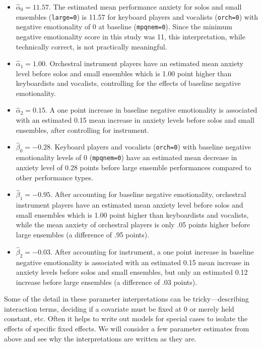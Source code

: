 \documentclass[
]{krantz}
\providecommand{\tightlist}{%
  \setlength{\itemsep}{0pt}\setlength{\parskip}{0pt}}
\begin{document}
\begin{itemize}
\tightlist
\item
  \(\hat{\alpha}_{0} = 11.57\). The estimated mean performance anxiety for solos and small ensembles (\texttt{large=0}) is 11.57 for keyboard players and vocalists (\texttt{orch=0}) with negative emotionality of 0 at baseline (\texttt{mpqnem=0}). Since the minimum negative emotionality score in this study was 11, this interpretation, while technically correct, is not practically meaningful.
\item
  \(\hat{\alpha}_{1} = 1.00\). Orchestral instrument players have an estimated mean anxiety level before solos and small ensembles which is 1.00 point higher than keyboardists and vocalists, controlling for the effects of baseline negative emotionality.
\item
  \(\hat{\alpha}_{2} = 0.15\). A one point increase in baseline negative emotionality is associated with an estimated 0.15 mean increase in anxiety levels before solos and small ensembles, after controlling for instrument.
\item
  \(\hat{\beta}_{0} = -0.28\). Keyboard players and vocalists (\texttt{orch=0}) with baseline negative emotionality levels of 0 (\texttt{mpqnem=0}) have an estimated mean decrease in anxiety level of 0.28 points before large ensemble performances compared to other performance types.
\item
  \(\hat{\beta}_{1} = -0.95\). After accounting for baseline negative emotionality, orchestral instrument players have an estimated mean anxiety level before solos and small ensembles which is 1.00 point higher than keyboardists and vocalists, while the mean anxiety of orchestral players is only .05 points higher before large ensembles (a difference of .95 points).
\item
  \(\hat{\beta}_{2} = -0.03\). After accounting for instrument, a one point increase in baseline negative emotionality is associated with an estimated 0.15 mean increase in anxiety levels before solos and small ensembles, but only an estimated 0.12 increase before large ensembles (a difference of .03 points).
\end{itemize}

Some of the detail in these parameter interpretations can be tricky---describing interaction terms, deciding if a covariate must be fixed at 0 or merely held constant, etc. Often it helps to write out models for special cases to isolate the effects of specific fixed effects. We will consider a few parameter estimates from above and see why the interpretations are written as they are.
\end{document}
